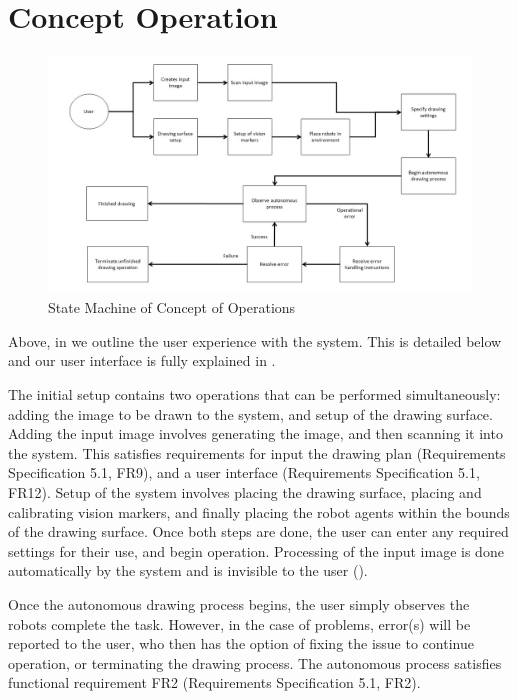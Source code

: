 
\pagebreak
\section{Concept Operation}
\label{sec:concept_operation}

\begin{figure}[h!]
 \centering
  \includegraphics[width=0.90\columnwidth]{diagrams/concept_operation_user.jpg}
	\caption{State Machine of Concept of Operations}
 \label{fig:concept_operation}
\end{figure}

Above, in  we outline the user experience with the system. This is detailed below and our user interface is fully explained in .

The initial setup contains two operations that can be performed simultaneously: adding the image to be drawn to the system, and setup of the drawing surface. Adding the input image involves generating the image, and then scanning it into the system. This satisfies requirements for input the drawing plan (Requirements Specification 5.1, FR9), and a user interface (Requirements Specification 5.1, FR12). Setup of the system involves placing the drawing surface, placing and calibrating vision markers, and finally placing the robot agents within the bounds of the drawing surface. Once both steps are done, the user can enter any required settings for their use, and begin operation. Processing of the input image is done automatically by the system and is invisible to the user ().

Once the autonomous drawing process begins, the user simply observes the robots  complete the task. However, in the case of problems, error(s) will be reported to the user, who then has the option of fixing the issue to continue operation, or terminating the drawing process. The autonomous process satisfies functional requirement FR2 (Requirements Specification 5.1, FR2).
